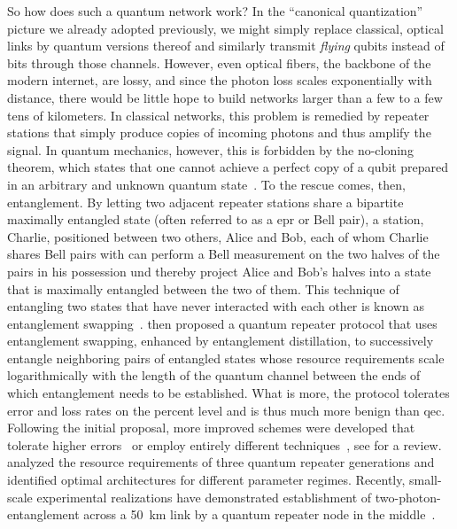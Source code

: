 So how does such a quantum network work?
In the \enquote{canonical quantization} picture we already adopted previously, we might simply replace classical, optical links by quantum versions thereof and similarly transmit \emph{flying} qubits instead of bits through those channels.
However, even optical fibers, the backbone of the modern internet, are lossy, and since the photon loss scales exponentially with distance, there would be little hope to build networks larger than a few to a few tens of kilometers.
In classical networks, this problem is remedied by repeater stations that simply produce copies of incoming photons and thus amplify the signal.
In quantum mechanics, however, this is forbidden by the no-cloning theorem, which states that one cannot achieve a perfect copy of a qubit prepared in an arbitrary and unknown quantum state~\cite{Wootters1982,Dieks1982}.
To the rescue comes, then, entanglement.
By letting two adjacent repeater stations share a bipartite maximally entangled state (often referred to as a \gls{epr} or Bell pair), a station, Charlie, positioned between two others, Alice and Bob, each of whom Charlie shares Bell pairs with can perform a Bell measurement on the two halves of the pairs in his possession und thereby project Alice and Bob's halves into a state that is maximally entangled between the two of them.
This technique of entangling two states that have never interacted with each other is known as entanglement swapping~\cite{Zukowski1993,Pan1998}.
\citet{Briegel1998,Dur1999} then proposed a quantum repeater protocol that uses entanglement swapping, enhanced by entanglement distillation,
to successively entangle neighboring pairs of entangled states whose resource requirements scale logarithmically with the length of the quantum channel between the ends of which entanglement needs to be established.
What is more, the protocol tolerates error and loss rates on the percent level and is thus much more benign than \gls{qec}.
Following the initial proposal, more improved schemes were developed that tolerate higher errors~\cite{Dur2007} or employ entirely different techniques~\cite{Bayrakci2022}, see  for a review.
\citet{Muralidharan2016} analyzed the resource requirements of three quantum repeater generations and identified optimal architectures for different parameter regimes.
Recently, small-scale experimental realizations have demonstrated establishment of two-photon-entanglement across a \qty{50}{\kilo\meter} link by a quantum repeater node in the middle~\cite{Krutyanskiy2023}.


